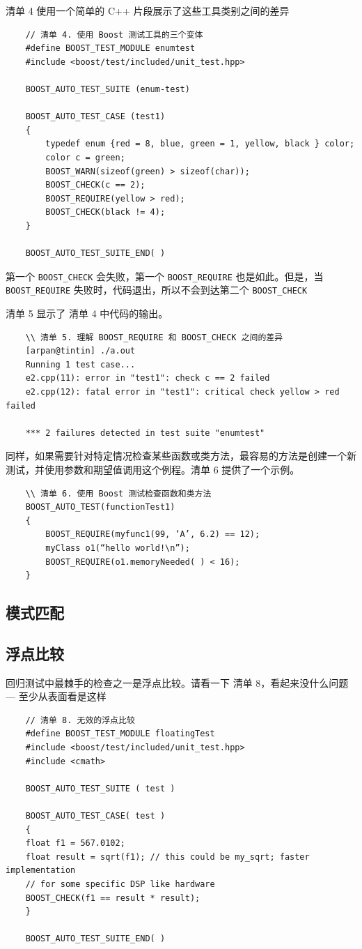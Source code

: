 \documentclass[UTF8,a4paper,12pt]{ctexbook}
\begin{document}
		 清单 4 使用一个简单的 C++ 片段展示了这些工具类别之间的差异
		 \begin{lstlisting}
	// 清单 4. 使用 Boost 测试工具的三个变体
	#define BOOST_TEST_MODULE enumtest
	#include <boost/test/included/unit_test.hpp>
	
	BOOST_AUTO_TEST_SUITE (enum-test) 
	
	BOOST_AUTO_TEST_CASE (test1)
	{
		typedef enum {red = 8, blue, green = 1, yellow, black } color;
		color c = green;
		BOOST_WARN(sizeof(green) > sizeof(char));
		BOOST_CHECK(c == 2); 
		BOOST_REQUIRE(yellow > red); 
		BOOST_CHECK(black != 4);
	}
	
	BOOST_AUTO_TEST_SUITE_END( )
		 \end{lstlisting}
		 第一个 \verb|BOOST_CHECK| 会失败，第一个 \verb|BOOST_REQUIRE| 也是如此。但是，当 \verb|BOOST_REQUIRE| 失败时，代码退出，所以不会到达第二个 \verb|BOOST_CHECK|
		 
		 清单 5 显示了 清单 4 中代码的输出。
		 \begin{lstlisting}
	\\ 清单 5. 理解 BOOST_REQUIRE 和 BOOST_CHECK 之间的差异
	[arpan@tintin] ./a.out
	Running 1 test case...
	e2.cpp(11): error in "test1": check c == 2 failed
	e2.cpp(12): fatal error in "test1": critical check yellow > red failed
	
	*** 2 failures detected in test suite "enumtest"
		 \end{lstlisting}
		 同样，如果需要针对特定情况检查某些函数或类方法，最容易的方法是创建一个新测试，并使用参数和期望值调用这个例程。清单 6 提供了一个示例。
		 \begin{lstlisting}
	\\ 清单 6. 使用 Boost 测试检查函数和类方法
	BOOST_AUTO_TEST(functionTest1) 
	{
		BOOST_REQUIRE(myfunc1(99, ‘A’, 6.2) == 12);
		myClass o1(“hello world!\n”);
		BOOST_REQUIRE(o1.memoryNeeded( ) < 16);
	}
		 \end{lstlisting}
		 \subsection{模式匹配}
		 
		 \subsection{浮点比较}
			 回归测试中最棘手的检查之一是浮点比较。请看一下 清单 8，看起来没什么问题 — 至少从表面看是这样
			 \begin{lstlisting}
	// 清单 8. 无效的浮点比较
	#define BOOST_TEST_MODULE floatingTest
	#include <boost/test/included/unit_test.hpp>
	#include <cmath>
	
	BOOST_AUTO_TEST_SUITE ( test ) 
	
	BOOST_AUTO_TEST_CASE( test )
	{
	float f1 = 567.0102;
	float result = sqrt(f1); // this could be my_sqrt; faster implementation
	// for some specific DSP like hardware
	BOOST_CHECK(f1 == result * result);  
	}
	
	BOOST_AUTO_TEST_SUITE_END( ) 
			 \end{lstlisting}
			 
\end{document}
